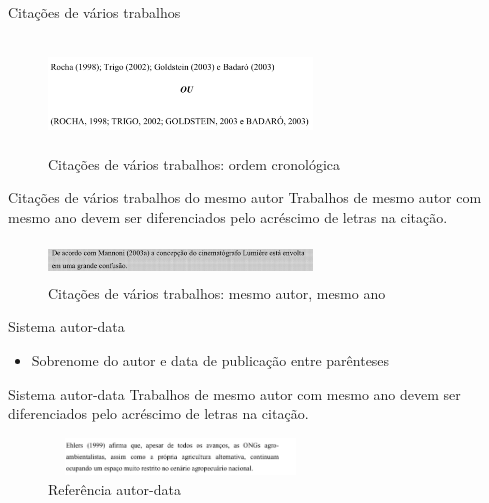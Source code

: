 \begin{frame}	
	\begin{block}{Citações de vários trabalhos}	
		 \begin{figure}[!htb]
			\centering	  				
			\includegraphics[height=3cm, width = 7cm]{./pic/cronologica.png}
			\caption{Citações de vários trabalhos: ordem cronológica \cite{GUIA_SENAC}}
			\label{fig_citacaoordemcronologica}
		\end{figure}
	\end{block}
\end{frame}

\begin{frame}	
	\begin{block}{Citações de vários trabalhos do mesmo autor}	
	Trabalhos de mesmo autor com mesmo ano devem ser diferenciados pelo acréscimo de letras na citação.
		 \begin{figure}[!htb]
			\centering	  				
			\includegraphics[height=1cm, width = 7cm]{./pic/letra.png}
			\caption{Citações de vários trabalhos: mesmo autor, mesmo ano \cite{GUIA_SENAC}}
			\label{fig_citacaovariosautoresiguais}
		\end{figure}
	\end{block}
\end{frame}

\begin{frame}	
	\begin{block}{Sistema autor-data}	
		\begin{itemize}
			\item Sobrenome do autor e data de publicação entre parênteses
		\end{itemize}
	\end{block}
\end{frame}

\begin{frame}	
	\begin{block}{Sistema autor-data}	
	Trabalhos de mesmo autor com mesmo ano devem ser diferenciados pelo acréscimo de letras na citação.
		 \begin{figure}[!htb]
			\centering	  				
			\includegraphics[height=1cm, width = 7cm]{./pic/autordata.png}
			\caption{Referência autor-data \cite{GUIA_SENAC}}
			\label{fig_citacaoautordata}
		\end{figure}
	\end{block}
\end{frame}

